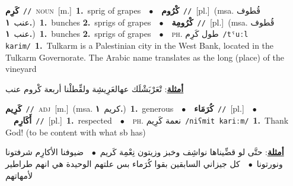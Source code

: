 \documentclass[10pt,a4paper,twoside]{article} %
\begin{document}
\begin{multicols}{2}
{\setlength\topsep{0pt}\textbf{\foreignlanguage{arabic}{كَرِم}}\ {\color{gray}\texttt{//}\color{black}}\ \textsc{noun}\ [m.]\ \textbf{1.}~sprig of grapes\ \ $\bullet$\ \ \setlength\topsep{0pt}\textbf{\foreignlanguage{arabic}{كْرُوم}}\ {\color{gray}\texttt{//}\color{black}}\ [pl.]\ \color{gray}(msa. \foreignlanguage{arabic}{قُطوف عنب}~\foreignlanguage{arabic}{\textbf{١.}})\color{black}\ \textbf{1.}~bunches  \textbf{2.}~sprigs of grapes\ \ $\bullet$\ \ \setlength\topsep{0pt}\textbf{\foreignlanguage{arabic}{كْرُومِة}}\ {\color{gray}\texttt{//}\color{black}}\ [pl.]\ \color{gray}(msa. \foreignlanguage{arabic}{قُطوف عنب}~\foreignlanguage{arabic}{\textbf{١.}})\color{black}\ \textbf{1.}~bunches  \textbf{2.}~sprigs of grapes\ \ $\bullet$\ \ \textsc{ph.} \color{gray} \foreignlanguage{arabic}{طول كَرِم}\color{black}\ {\color{gray}\texttt{/{\sffamily tˤuːl karim}/}\color{black}}\ \textbf{1.}~Tulkarm is a Palestinian city in the West Bank, located in the Tulkarm Governorate. The Arabic name translates as the long (place) of the vineyard\  \begin{flushright}\color{gray}\foreignlanguage{arabic}{\textbf{\underline{\foreignlanguage{arabic}{أمثلة}}}: تْعَرْبَشْلَك عهالعَرِيشِة ولقِّطلْنا أربعة كْروم عنب}\end{flushright}\color{black}} \vspace{2mm}

{\setlength\topsep{0pt}\textbf{\foreignlanguage{arabic}{كَرِيم}}\ {\color{gray}\texttt{//}\color{black}}\ \textsc{adj}\ [m.]\ \color{gray}(msa. \foreignlanguage{arabic}{كريم}~\foreignlanguage{arabic}{\textbf{١.}})\color{black}\ \textbf{1.}~generous\ \ $\bullet$\ \ \setlength\topsep{0pt}\textbf{\foreignlanguage{arabic}{كُرَمَاء}}\ {\color{gray}\texttt{//}\color{black}}\ [pl.]\ \ $\bullet$\ \ \setlength\topsep{0pt}\textbf{\foreignlanguage{arabic}{أَكَارِم}}\ {\color{gray}\texttt{//}\color{black}}\ [pl.]\ \textbf{1.}~respected\ \ $\bullet$\ \ \textsc{ph.} \color{gray} \foreignlanguage{arabic}{نعمة كَرِيم}\color{black}\ {\color{gray}\texttt{/{\sffamily niʕmit kariːm}/}\color{black}}\ \textbf{1.}~Thank God! (to be content with what sb has)\  \begin{flushright}\color{gray}\foreignlanguage{arabic}{\textbf{\underline{\foreignlanguage{arabic}{أمثلة}}}: حتَّى لو قضِّيناها نواشِف وخبز وزيتون نِعْمِة كَريم\ $\bullet$\ \  ضيوفنا الأكارِم شرفتونا ونورتونا\ $\bullet$\ \  كل جيزاني السابقين بقوا كُرَماء بس علتهم الوحيدة هي انهم طراطير لأمهاتهم}\end{flushright}\color{black}} \vspace{2mm}


\end{multicols}
\end{document}
